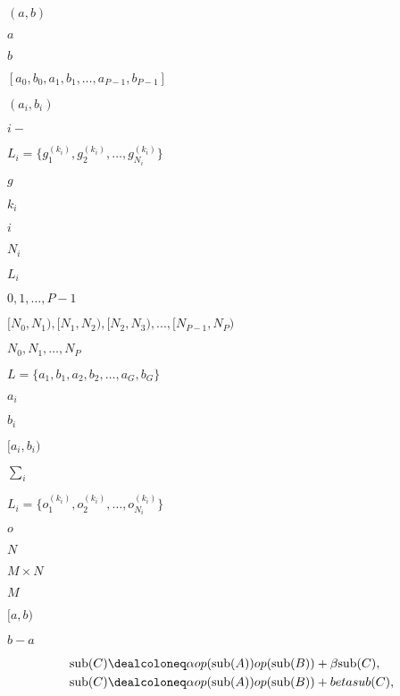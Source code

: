 \documentclass{article}
\begin{document}
$(a,b)$
\pagebreak

$a$
\pagebreak

$b$
\pagebreak

$[a_0,b_0,a_1,b_1,\ldots,a_{P-1},b_{P-1}]$
\pagebreak

$(a_i,b_i)$
\pagebreak

$i-$
\pagebreak

$L_i = \{g^{(k_i)}_1,g^{(k_i)}_2,\ldots,g^{(k_i)}_{N_i}\}$
\pagebreak

$g$
\pagebreak

$k_i$
\pagebreak

$i$
\pagebreak

$N_i$
\pagebreak

$L_i$
\pagebreak

$0, 1,\ldots,P-1$
\pagebreak

$[N_0,N_1), [N_1, N_2), [N_2, N_3), ..., [N_{P-1},N_P)$
\pagebreak

$N_0, N_1,\ldots, N_P$
\pagebreak

$L=\{a_1,b_1, a_2, b_2, \ldots, a_G, b_G\}$
\pagebreak

$a_i$
\pagebreak

$b_i$
\pagebreak

$[a_i,b_i)$
\pagebreak

$\sum_i$
\pagebreak

$L_i = \{o^{(k_i)}_1,o^{(k_i)}_2,\ldots,o^{(k_i)}_{N_i}\}$
\pagebreak

$o$
\pagebreak

$N$
\pagebreak

$M \times N$
\pagebreak

$M $
\pagebreak

$[a,b)$
\pagebreak

$b-a$
\pagebreak

\begin{align*}
\mathrm{sub}(C) &\dealcoloneq \alpha
op(\mathrm{sub}(A))op(\mathrm{sub}(B))
                           + \beta \mathrm{sub}(C), \\
\mathrm{sub}(C) &\dealcoloneq \alpha
op(\mathrm{sub}(A))op(\mathrm{sub}(B))
                           + beta sub(C),
\end{align*}
\pagebreak
\end{document}
